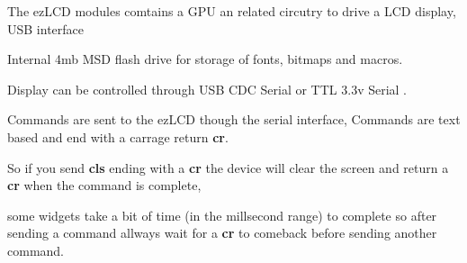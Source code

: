 The ez\-L\-C\-D modules comtains a G\-P\-U an related circutry to drive a L\-C\-D display, U\-S\-B interface \par
 Internal 4mb M\-S\-D flash drive for storage of fonts, bitmaps and macros.\par
 Display can be controlled through U\-S\-B C\-D\-C Serial or T\-T\-L 3.\-3v Serial .\par
 \par
 Commands are sent to the ez\-L\-C\-D though the serial interface, Commands are text based and end with a carrage return {\bfseries cr}.\par
 So if you send {\bfseries cls} ending with a {\bfseries cr} the device will clear the screen and return a {\bfseries cr} when the command is complete,\par
 some widgets take a bit of time (in the millsecond range) to complete so after sending a command allways wait for a {\bfseries cr} to comeback before sending another command.\par
